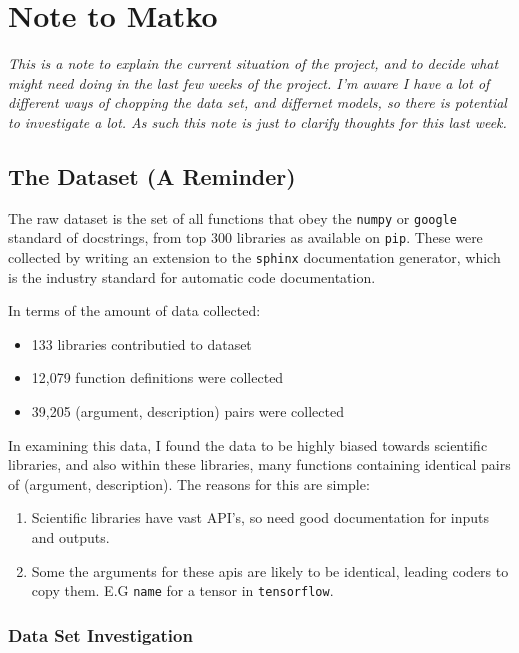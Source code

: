 \chapter{Note to Matko}
\label{baselines_note}

\textit{
This is a note to explain the current situation of the project, and to decide what might need doing in the last few weeks of the project. 
I'm aware I have a lot of different ways of chopping the data set, and differnet models, so there is potential to investigate a lot.
As such this note is just to clarify thoughts for this last week.}

\section{The Dataset (A Reminder)} %
\label{sec:the_dataset}

The raw dataset is the set of all functions that obey the \texttt{numpy} or \texttt{google} standard of docstrings, from top 300 libraries as available on \texttt{pip}. 
These were collected by writing an extension to the \texttt{sphinx} documentation generator, which is the industry standard for automatic code documentation.

In terms of the amount of data collected:
\begin{itemize}
    \item 133 libraries contributied to dataset
    \item 12,079 function definitions were collected
    \item 39,205 (argument, description) pairs were collected
\end{itemize}

In examining this data, I found the data to be highly biased towards scientific libraries, and also within these libraries, many functions containing identical pairs of (argument, description). 
The reasons for this are simple: 
\begin{enumerate}
    \item Scientific libraries have vast API's, so need good documentation for inputs and outputs.
    \item Some the arguments for these apis are likely to be identical, leading coders to copy them. 
    E.G \texttt{name} for a tensor in \texttt{tensorflow}.
\end{enumerate} 

\subsection{Data Set Investigation} %
\label{ssub:datasetinvestigation}

